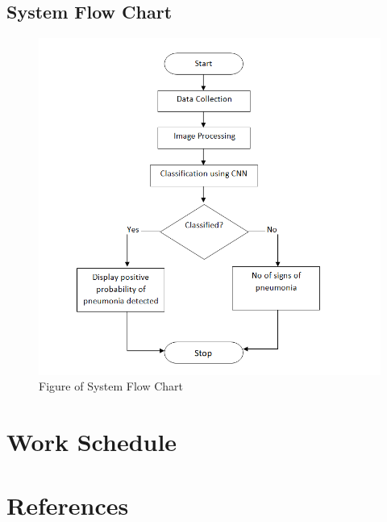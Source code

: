\documentclass[12pt, a4paper]{report}
\begin{document}
\section{System Flow Chart}
\begin{figure}
\includegraphics[width=350 pt ,height=500 pt]{system.png}\caption{Figure of System Flow Chart \label{fig:3.3}}
\end{figure}
\vfill


\chapter{Work Schedule}



\chapter*{References}
\end{document}

